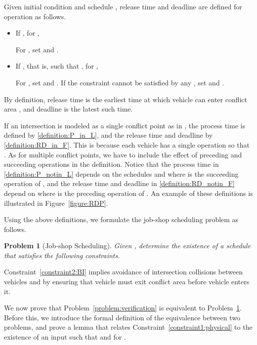 \documentclass{sig-alternate}
\newtheorem{problem}{Problem}
\begin{document}
\begin{definition}
	Given initial condition  and schedule , release time  and deadline  are defined for operation  as follows.
	
	\begin{itemize}
		\item If , for , 
		
		For , set  and .
		\item If , that is,  such that , for ,
		
		For , set  and . If the constraint cannot be satisfied by any , set  and .
	\end{itemize}	
	\end{definition}
	By definition, release time  is the earliest time at which vehicle  can enter conflict area , and deadline  is the latest such time. 
	

	If an intersection is modeled as a single conflict point as in \cite{colombo_efficient_2012,colombo_least_2014}, the process time is defined by \eqref{definition:P_in_L}, and the release time and deadline by \eqref{definition:RD_in_F}. This is because each vehicle has a single operation so that . As for multiple conflict points, we have to include the effect of preceding and succeeding operations in the definition. Notice that the process time  in \eqref{definition:P_notin_L} depends on the schedules  and  where  is the succeeding operation of , and the release time  and deadline  in \eqref{definition:RD_notin_F} depend on  where  is the preceding operation of . An example of these definitions is illustrated in Figure~\ref{figure:RDP}.
	
	
Using the above definitions, we formulate the job-shop scheduling problem as follows.
\begin{problem}[Job-shop Scheduling]\label{problem:job-shop}
Given , determine the existence of a schedule  that satisfies the following constraints.

\end{problem}

Constraint~\eqref{constraint2:BI} implies avoidance of intersection collisions between vehicles  and  by ensuring that vehicle  must exit conflict area  before vehicle  enters it. 


We now prove that Problem~\ref{problem:verification} is equivalent to Problem~\ref{problem:job-shop}. Before this, we introduce the formal definition of the equivalence between two problems, and prove a lemma that relates Constraint~\eqref{constraint1:physical} to the existence of an input  such that  and  for .
\end{document}
